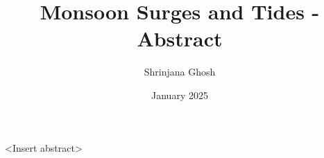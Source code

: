 \documentclass{article}
\begin{document}
\title{Monsoon Surges and Tides - Abstract}
\author{Shrinjana Ghosh}
\date{January 2025}
\vfill





\maketitle

\textless Insert abstract\textgreater
\end{document}
